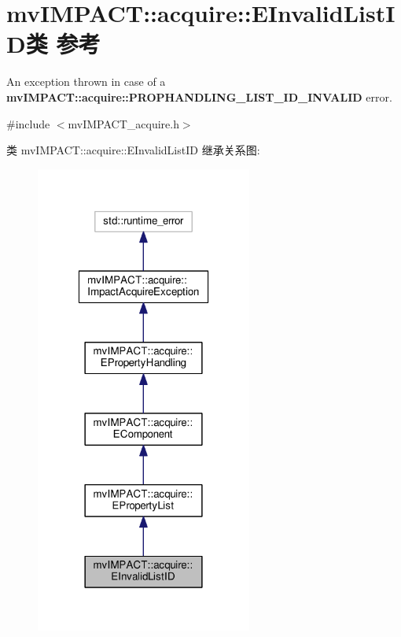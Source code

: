\hypertarget{classmv_i_m_p_a_c_t_1_1acquire_1_1_e_invalid_list_i_d}{\section{mv\+I\+M\+P\+A\+C\+T\+:\+:acquire\+:\+:E\+Invalid\+List\+I\+D类 参考}
\label{classmv_i_m_p_a_c_t_1_1acquire_1_1_e_invalid_list_i_d}
}


An exception thrown in case of a {\bfseries mv\+I\+M\+P\+A\+C\+T\+::acquire\+::\+P\+R\+O\+P\+H\+A\+N\+D\+L\+I\+N\+G\+\_\+\+L\+I\+S\+T\+\_\+\+I\+D\+\_\+\+I\+N\+V\+A\+L\+I\+D} error.  




{\ttfamily \#include $<$mv\+I\+M\+P\+A\+C\+T\+\_\+acquire.\+h$>$}



类 mv\+I\+M\+P\+A\+C\+T\+:\+:acquire\+:\+:E\+Invalid\+List\+I\+D 继承关系图\+:
\nopagebreak
\begin{figure}[H]
\begin{center}
\leavevmode
\includegraphics[width=202pt]{classmv_i_m_p_a_c_t_1_1acquire_1_1_e_invalid_list_i_d__inherit__graph}
\end{center}
\end{figure}


